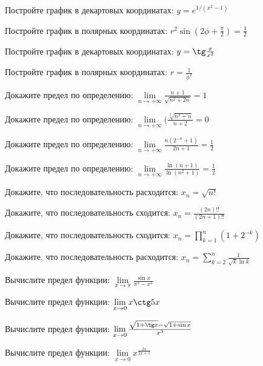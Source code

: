 \documentclass[russian]{article}
\begin{document}
Постройте график в декартовых координатах:
$y = e^{1/(x^2 - 1)}$

Постройте график в полярных координатах:
$r^2 \sin(2\phi + \frac{\pi}{2}) = \frac{1}{2}$

Постройте график в декартовых координатах:
$y = \tg\frac{\pi}{x^2}$

Постройте график в полярных координатах:
$r = \frac{1}{\phi^2}$



Докажите предел по определению:
$\lim\limits_{n \to +\infty} \frac{n + 1}{\sqrt{n^2 + 2n}} = 1$

Докажите предел по определению:
$\lim\limits_{n \to +\infty} (\frac{\sqrt[3]{n^2 + n}}{n + 2} = 0$

Докажите предел по определению:
$\lim\limits_{n \to +\infty} \frac{n(2^{-n} + 1)}{2n  + 1} = \frac{1}{2}$

Докажите предел по определению:
$\lim\limits_{n \to +\infty} \frac{\ln(n + 1)}{\ln(n^2 + 1)} = \frac{1}{2}$



Докажите, что последовательность расходится:
$x_n = \sqrt{n!}$

Докажите, что последовательность сходится:
$x_n = \frac{(2n)!!}{(2n + 1)!!}$

Докажите, что последовательность сходится:
$x_n = \prod_{k = 1}^{n}(1 + 2^{-k})$

Докажите, что последовательность расходится:
$x_n = \sum_{k = 2}^n \frac{1}{\sqrt{k} \ln k}$




Вычислите предел функции:
$\lim\limits_{x \to \pi} \frac{\sin x}{\pi^3 - x^3}$

Вычислите предел функции:
$\lim\limits_{x \to 0} x \ctg 5x$

Вычислите предел функции:
$\lim\limits_{x \to 0} \frac{\sqrt{1 + \tg x} - \sqrt{1 + \sin x}}{x ^ 3}$

Вычислите предел функции:
$\lim\limits_{x \to 0} x^{\frac{2x}{2x + 1}}$
\end{document}
